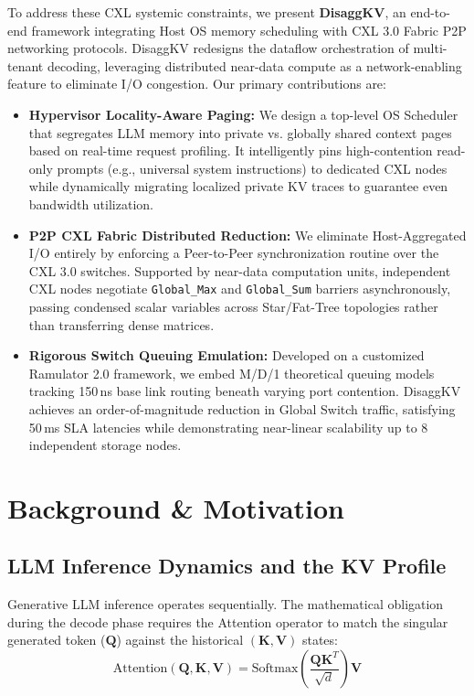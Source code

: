 \documentclass[10pt,conference]{IEEEtran}
\begin{document}
To address these CXL systemic constraints, we present \textbf{DisaggKV}, an end-to-end framework integrating Host OS memory scheduling with CXL 3.0 Fabric P2P networking protocols. DisaggKV redesigns the dataflow orchestration of multi-tenant decoding, leveraging distributed near-data compute as a network-enabling feature to eliminate I/O congestion. Our primary contributions are:

\begin{itemize}
    \item \textbf{Hypervisor Locality-Aware Paging:} We design a top-level OS Scheduler that segregates LLM memory into private vs. globally shared context pages based on real-time request profiling. It intelligently pins high-contention read-only prompts (e.g., universal system instructions) to dedicated CXL nodes while dynamically migrating localized private KV traces to guarantee even bandwidth utilization.
    \item \textbf{P2P CXL Fabric Distributed Reduction:} We eliminate Host-Aggregated I/O entirely by enforcing a Peer-to-Peer synchronization routine over the CXL 3.0 switches. Supported by near-data computation units, independent CXL nodes negotiate \texttt{Global\_Max} and \texttt{Global\_Sum} barriers asynchronously, passing condensed scalar variables across Star/Fat-Tree topologies rather than transferring dense matrices.
    \item \textbf{Rigorous Switch Queuing Emulation:} Developed on a customized Ramulator 2.0 framework, we embed M/D/1 theoretical queuing models tracking 150\,ns base link routing beneath varying port contention. DisaggKV achieves an order-of-magnitude reduction in Global Switch traffic, satisfying 50\,ms SLA latencies while demonstrating near-linear scalability up to 8 independent storage nodes.
\end{itemize}


\section{Background \& Motivation}

\subsection{LLM Inference Dynamics and the KV Profile}
Generative LLM inference operates sequentially. The mathematical obligation during the decode phase requires the Attention operator to match the singular generated token ($\mathbf{Q}$) against the historical $(\mathbf{K, V})$ states:
\begin{equation}
\label{eq:attn}
\text{Attention}(\mathbf{Q}, \mathbf{K}, \mathbf{V}) = \text{Softmax}\left( \frac{\mathbf{Q} \mathbf{K}^T}{\sqrt{d}} \right) \mathbf{V}
\end{equation}
\end{document}
